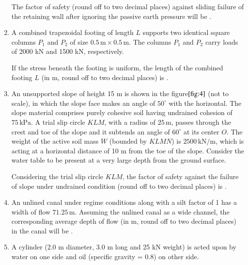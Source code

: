 \documentclass[journal]{IEEEtran}
\numberwithin{equation}{enumi}
\numberwithin{figure}{enumi}
\begin{document}
\begin{enumerate}
The factor of safety (round off to two decimal places) against sliding failure of the retaining wall after ignoring the passive earth pressure will be \underline{\hspace{2cm}}.
\begin{figure}[H]
			\centering
			
			\caption{}
			\label{fig:2}
	\end{figure}
\bigskip
\item A combined trapezoidal footing of length $L$ supports two identical square columns $P_1$ and $P_2$ of size $0.5 \, \text{m} \times 0.5 \, \text{m}$. The columns $P_1$ and $P_2$ carry loads of 2000 kN and 1500 kN, respectively.

If the stress beneath the footing is uniform, the length of the combined footing $L$ (in m, round off to two decimal places) is \underline{\hspace{2cm}}.
\begin{figure}[H]
			\centering
			
			\caption{}
			\label{fig:3}
	\end{figure}
\bigskip
\item
An unsupported slope of height 15 m is shown in the figure$\ref{fig:4}$ (not to scale), in which the slope face makes an angle of $50^\circ$ with the horizontal. The slope material comprises purely cohesive soil having undrained cohesion of $75 \, \text{kPa}$. A trial slip circle $KLM$, with a radius of $25 \, \text{m}$, passes through the crest and toe of the slope and it subtends an angle of $60^\circ$ at its center $O$. The weight of the active soil mass $W$ (bounded by $KLMN$) is $2500 \, \text{kN/m}$, which is acting at a horizontal distance of 10 m from the toe of the slope. Consider the water table to be present at a very large depth from the ground surface.

Considering the trial slip circle $KLM$, the factor of safety against the failure of slope under undrained condition (round off to two decimal places) is \underline{\hspace{2cm}}.
\begin{figure}[H]
			\centering
			
			\caption{}
			\label{fig:4}
	\end{figure}
\bigskip

\item 
An unlined canal under regime conditions along with a silt factor of 1 has a width of flow $71.25 \, \text{m}$. Assuming the unlined canal as a wide channel, the corresponding average depth of flow (in m, round off to two decimal places) in the canal will be \underline{\hspace{2cm}}.
\bigskip
\item
A cylinder (2.0 m diameter, 3.0 m long and 25 kN weight) is acted upon by water on one side and oil (specific gravity = 0.8) on other side. 


\end{enumerate}
\end{document}
